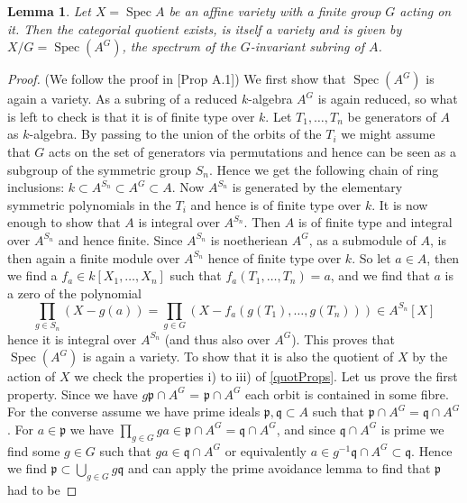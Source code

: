 \documentclass[11pt, a4paper, german]{article}
\theoremstyle{plain}
\newtheorem{lemma}[theorem]{Lemma}
\theoremstyle{definition}
\DeclareMathOperator{\Spec}{Spec}
\begin{document}
\begin{lemma}
    \label{quotAffine}
    Let $X = \Spec{A}$ be an affine variety with a finite group $G$ acting on it. Then the categorial quotient exists, is itself a variety and
    is given by $X/G = \Spec(A^G)$, the spectrum of the $G$-invariant subring of $A$.
\end{lemma}
\begin{proof}(We follow the proof in \cite{mustata}[Prop A.1])
    We first show that $\Spec(A^G)$ is again a variety. As a subring of a reduced $k$-algebra $A^G$ is again reduced, so what is left to check
    is that it is of finite type over $k$. Let $T_1,\dots,T_n$ be generators of $A$ as $k$-algebra. By passing to the union of the orbits of
    the $T_i$ we might assume that $G$ acts on the set of generators via permutations and hence can be seen as a subgroup of the 
    symmetric group $S_n$. Hence we get the following chain of ring inclusions: $k \subset A^{S_n} \subset A^G \subset A$. Now $A^{S_n}$ is
    generated by the elementary symmetric polynomials in the $T_i$ and hence is of finite type over $k$.
    It is now enough to show that $A$ is integral over $A^{S_n}$. Then $A$ is of finite type and integral over $A^{S_n}$ and hence
    finite. Since $A^{S_n}$ is noetheriean $A^G$, as a submodule of $A$, 
    is then again a finite module over $A^{S_n}$ hence of finite type over $k$.
    So let $a \in A$, then we find a $f_a \in k[X_1,\dots,X_n]$ such that $f_a(T_1,\dots,T_n) = a$, and we find that $a$ is a zero of
    the polynomial
    \[
        \prod_{g \in S_n} (X - g(a)) = \prod_{g \in G} (X - f_a(g(T_1),\dots,g(T_n))) \in A^{S_n}[X]
    \]
    hence it is integral over $A^{S_n}$ (and thus also over $A^G$).
    This proves that $\Spec(A^G)$ is again a variety. To show that it is also the quotient of $X$ by the action of $X$ we check the properties
    i) to iii) of \ref{quotProps}. Let us prove the first property.
    Since we have $g\mathfrak{p} \cap A^G$ = $\mathfrak{p} \cap A^G$ each orbit is contained in some fibre. For the converse assume we have
    prime ideals $\mathfrak{p},\mathfrak{q} \subset A$ such that $\mathfrak{p} \cap A^G = \mathfrak{q} \cap A^G$.
    For $a \in \mathfrak{p}$ we have $\prod_{g \in G} ga \in \mathfrak{p} \cap A^G = \mathfrak{q} \cap A^G$, and since $\mathfrak{q} \cap A^G$
    is prime we find some $g \in G$ such that $ga \in \mathfrak{q} \cap A^G$ or equivalently 
    $a \in g^{-1}\mathfrak{q} \cap A^G \subset \mathfrak{q}$. Hence 
    we find $\mathfrak{p} \subset \bigcup_{g \in G} g\mathfrak{q}$ and can apply the prime avoidance lemma to find that $\mathfrak{p}$ had to be

\end{proof}
\end{document}
